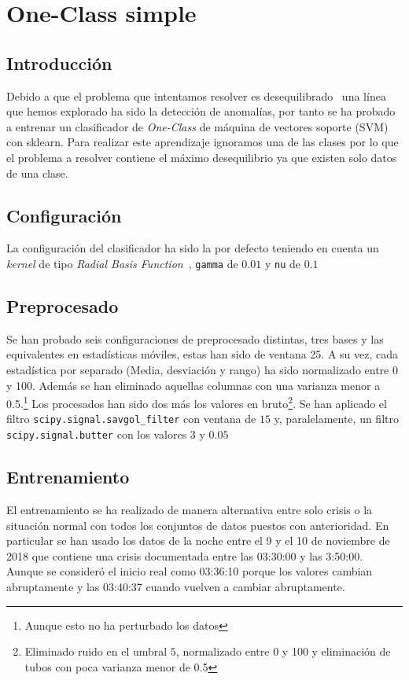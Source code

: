 \documentclass[a4paper,12pt,twoside,oldfontcommands]{memoir}
\begin{document}
	\chapter{One-Class simple}
	\section{Introducción}
	Debido a que el problema que intentamos resolver es desequilibrado~\cite{galar2012review} una línea que hemos explorado ha sido la detección de anomalías, por tanto se ha probado a entrenar un clasificador de \textit{One-Class} de máquina de vectores soporte (SVM) con sklearn. Para realizar este aprendizaje ignoramos una de las clases por lo que el problema a resolver contiene el máximo desequilibrio ya que existen solo datos de una clase.
	\section{Configuración}
	La configuración del clasificador ha sido la por defecto teniendo en cuenta un \textit{kernel} de tipo \textit{Radial Basis Function}~\cite{wiki:rbf}, \texttt{gamma} de \(0.01\) y \texttt{nu} de \(0.1\) 
	\section{Preprocesado}
	Se han probado seis configuraciones de preprocesado distintas, tres bases y las equivalentes en estadísticas móviles, estas han sido de ventana 25. A su vez, cada estadística por separado (Media, desviación y rango) ha sido normalizado entre 0 y 100. Además se han eliminado aquellas columnas con una varianza menor a 0.5.\footnote{Aunque esto no ha perturbado los datos}
	Los procesados han sido dos más los valores en bruto\footnote{Eliminado ruido en el umbral \(5\), normalizado entre 0 y 100 y eliminación de tubos con poca varianza menor de 0.5}. Se han aplicado el filtro \texttt{scipy.signal.savgol\_filter} con ventana de \(15\) y, paralelamente, un filtro \texttt{scipy.signal.butter} con los valores \(3\) y \(0.05\)
	
	\section{Entrenamiento}
	El entrenamiento se ha realizado de manera alternativa entre solo crisis o la situación normal con todos los conjuntos de datos puestos con anterioridad. En particular se han usado los datos de la noche entre el 9 y el 10 de noviembre de 2018 que contiene una crisis documentada entre las 03:30:00 y las 3:50:00. Aunque se consideró el inicio real como 03:36:10 porque los valores cambian abruptamente y las 03:40:37 cuando vuelven a cambiar abruptamente. 
	
\end{document}
